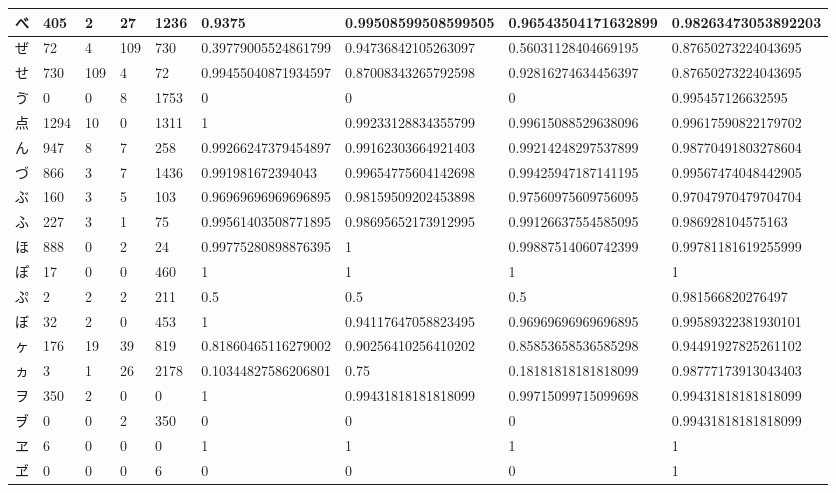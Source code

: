 \begin{table}[H]
\begin{center}
\begin{CJK}{UTF8}{min}
\begin{tabular}{ | l | l | l | l | l | l | l | l | l | }
			べ & 405 & 2 & 27 & 1236 & 0.9375 & 0.99508599508599505 & 0.96543504171632899 & 0.98263473053892203 \\ \hline
			ぜ & 72 & 4 & 109 & 730 & 0.39779005524861799 & 0.94736842105263097 & 0.56031128404669195 & 0.87650273224043695 \\ \hline
			せ & 730 & 109 & 4 & 72 & 0.99455040871934597 & 0.87008343265792598 & 0.92816274634456397 & 0.87650273224043695 \\ \hline
			ゔ & 0 & 0 & 8 & 1753 & 0 & 0 & 0 & 0.995457126632595 \\ \hline
			点 & 1294 & 10 & 0 & 1311 & 1 & 0.99233128834355799 & 0.99615088529638096 & 0.99617590822179702 \\ \hline
			ん & 947 & 8 & 7 & 258 & 0.99266247379454897 & 0.99162303664921403 & 0.99214248297537899 & 0.98770491803278604 \\ \hline
			づ & 866 & 3 & 7 & 1436 & 0.991981672394043 & 0.99654775604142698 & 0.99425947187141195 & 0.99567474048442905 \\ \hline
			ぶ & 160 & 3 & 5 & 103 & 0.96969696969696895 & 0.98159509202453898 & 0.97560975609756095 & 0.97047970479704704 \\ \hline
			ふ & 227 & 3 & 1 & 75 & 0.99561403508771895 & 0.98695652173912995 & 0.99126637554585095 & 0.986928104575163 \\ \hline
			ほ & 888 & 0 & 2 & 24 & 0.99775280898876395 & 1 & 0.99887514060742399 & 0.99781181619255999 \\ \hline
			ぽ & 17 & 0 & 0 & 460 & 1 & 1 & 1 & 1 \\ \hline
			ぷ & 2 & 2 & 2 & 211 & 0.5 & 0.5 & 0.5 & 0.981566820276497 \\ \hline
			ぼ & 32 & 2 & 0 & 453 & 1 & 0.94117647058823495 & 0.96969696969696895 & 0.99589322381930101 \\ \hline
			ヶ & 176 & 19 & 39 & 819 & 0.81860465116279002 & 0.90256410256410202 & 0.85853658536585298 & 0.94491927825261102 \\ \hline
			ヵ & 3 & 1 & 26 & 2178 & 0.10344827586206801 & 0.75 & 0.18181818181818099 & 0.98777173913043403 \\ \hline
			ヲ & 350 & 2 & 0 & 0 & 1 & 0.99431818181818099 & 0.99715099715099698 & 0.99431818181818099 \\ \hline
			ヺ & 0 & 0 & 2 & 350 & 0 & 0 & 0 & 0.99431818181818099 \\ \hline
			ヱ & 6 & 0 & 0 & 0 & 1 & 1 & 1 & 1 \\ \hline
			ヹ & 0 & 0 & 0 & 6 & 0 & 0 & 0 & 1 \\ \hline

\end{tabular}
\end{CJK}
\end{center}
\end{table}
